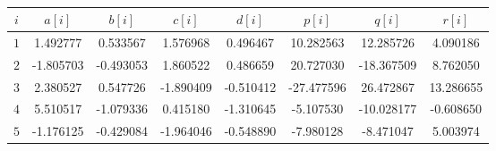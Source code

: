 \documentclass[paper=a4, fontsize=11pt]{scrartcl} %
\numberwithin{equation}{section} %
\numberwithin{figure}{section} %
\numberwithin{table}{section} %
\begin{document}
\begin{center}
\begin{table}[h]
\label{T2}
\caption{}
\begin{tabular}{|c|c|c|c|c|c|c|c|}
\hline 
$i$ & $a[i]$ & $b[i]$ & $c[i]$ & $d[i]$ & $p[i]$ & $q[i]$ & $r[i]$ \\ 
\hline 
$1$ & 1.492777 & 0.533567 & 1.576968 & 0.496467 & 10.282563 & 12.285726 & 4.090186 \\
\hline
$2$ & -1.805703 & -0.493053 & 1.860522 & 0.486659 & 20.727030 & -18.367509 & 8.762050 \\
\hline
$3$ & 2.380527 & 0.547726 & -1.890409 & -0.510412 & -27.477596 & 26.472867 & 13.286655 \\
\hline
$4$ & 5.510517 & -1.079336 & 0.415180 & -1.310645 & -5.107530 & -10.028177 & -0.608650 \\
\hline
$5$ & -1.176125 & -0.429084 & -1.964046 & -0.548890 & -7.980128 & -8.471047 & 5.003974 \\
\hline 
\end{tabular} 
\end{table}
\end{center}
\end{document}
